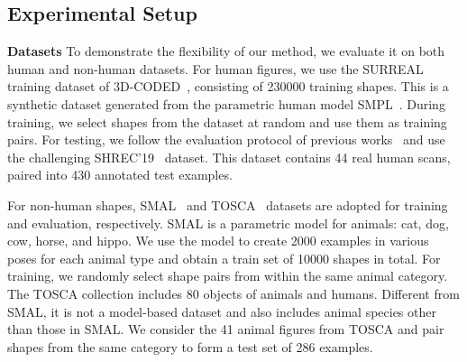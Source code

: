 \subsection{Experimental Setup} \label{subsec:experimental_setup}
\noindent \textbf{Datasets} \quad To demonstrate the flexibility of our method, we evaluate it on both human and non-human datasets. For human figures, we use the SURREAL training dataset of 3D-CODED~\cite{groueix20183dcoded}, consisting of 230000 training shapes. This is a synthetic dataset generated from the parametric human model SMPL~\cite{loper2015smpl}. During training, we select shapes from the dataset at random and use them as training pairs. For testing, we follow the evaluation protocol of previous works~\cite{groueix20183dcoded, deprelle2019learning, zeng2020corrnet3d} and use the challenging SHREC'19~\cite{melzi2019matching} dataset. This dataset contains 44 real human scans, paired into 430 annotated test examples.





For non-human shapes, SMAL~\cite{zuffi20173dmenagerie} and TOSCA~\cite{bronstein2008numerical} datasets are adopted for training and evaluation, respectively. SMAL is a parametric model for animals: cat, dog, cow, horse, and hippo. We use the model to create 2000 examples in various poses for each animal type and obtain a train set of 10000 shapes in total. For training, we randomly select shape pairs from within the same animal category. The TOSCA collection includes 80 objects of animals and humans. Different from SMAL, it is not a model-based dataset and also includes animal species other than those in SMAL. We consider the 41 animal figures from TOSCA and pair shapes from the same category to form a test set of 286 examples.

